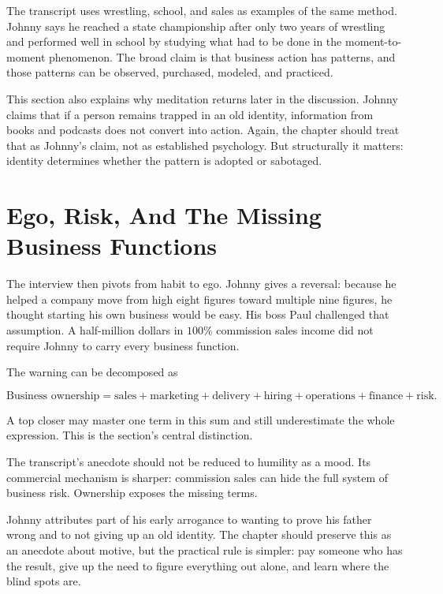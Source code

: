 The transcript uses wrestling, school, and sales as examples of the same method. Johnny says he reached a state championship after only two years of wrestling and performed well in school by studying what had to be done in the moment-to-moment phenomenon. The broad claim is that business action has patterns, and those patterns can be observed, purchased, modeled, and practiced.

This section also explains why meditation returns later in the discussion. Johnny claims that if a person remains trapped in an old identity, information from books and podcasts does not convert into action. Again, the chapter should treat that as Johnny's claim, not as established psychology. But structurally it matters: identity determines whether the pattern is adopted or sabotaged.

\section{Ego, Risk, And The Missing Business Functions}

The interview then pivots from habit to ego. Johnny gives a reversal: because he helped a company move from high eight figures toward multiple nine figures, he thought starting his own business would be easy. His boss Paul challenged that assumption. A half-million dollars in \(100\%\) commission sales income did not require Johnny to carry every business function.

The warning can be decomposed as

\begin{equation}
\text{Business ownership}
=
\text{sales}
+
\text{marketing}
+
\text{delivery}
+
\text{hiring}
+
\text{operations}
+
\text{finance}
+
\text{risk}.
\end{equation}

A top closer may master one term in this sum and still underestimate the whole expression. This is the section's central distinction.

\begin{remark}
The transcript's anecdote should not be reduced to humility as a mood. Its commercial mechanism is sharper: commission sales can hide the full system of business risk. Ownership exposes the missing terms.
\end{remark}

Johnny attributes part of his early arrogance to wanting to prove his father wrong and to not giving up an old identity. The chapter should preserve this as an anecdote about motive, but the practical rule is simpler: pay someone who has the result, give up the need to figure everything out alone, and learn where the blind spots are.


